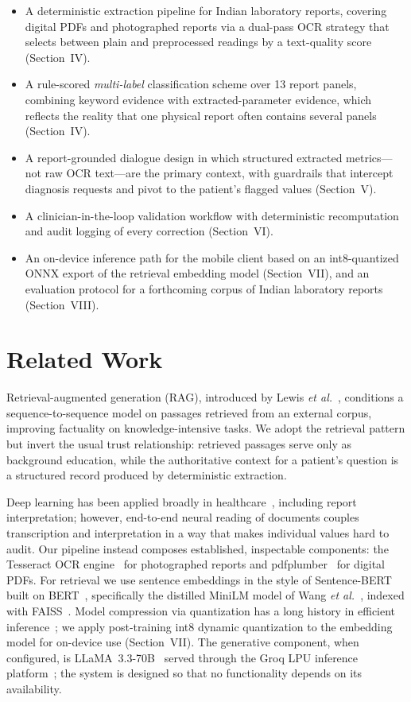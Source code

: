 \documentclass[conference]{IEEEtran}
\begin{document}
\begin{itemize}
\item A deterministic extraction pipeline for Indian laboratory
reports, covering digital PDFs and photographed reports via a dual-pass
OCR strategy that selects between plain and preprocessed readings by a
text-quality score (Section~IV).
\item A rule-scored \emph{multi-label} classification scheme over 13
report panels, combining keyword evidence with extracted-parameter
evidence, which reflects the reality that one physical report often
contains several panels (Section~IV).
\item A report-grounded dialogue design in which structured extracted
metrics---not raw OCR text---are the primary context, with guardrails
that intercept diagnosis requests and pivot to the patient's flagged
values (Section~V).
\item A clinician-in-the-loop validation workflow with deterministic
recomputation and audit logging of every correction (Section~VI).
\item An on-device inference path for the mobile client based on an
int8-quantized ONNX export of the retrieval embedding model
(Section~VII), and an evaluation protocol for a forthcoming corpus of
Indian laboratory reports (Section~VIII).
\end{itemize}

\section{Related Work}
Retrieval-augmented generation (RAG), introduced by Lewis \emph{et
al.}~\cite{lewis2020rag}, conditions a sequence-to-sequence model on
passages retrieved from an external corpus, improving factuality on
knowledge-intensive tasks. We adopt the retrieval pattern but invert
the usual trust relationship: retrieved passages serve only as
background education, while the authoritative context for a patient's
question is a structured record produced by deterministic extraction.

Deep learning has been applied broadly in healthcare~\cite{esteva2019guide},
including report interpretation; however, end-to-end neural reading of
documents couples transcription and interpretation in a way that makes
individual values hard to audit. Our pipeline instead composes
established, inspectable components: the Tesseract OCR
engine~\cite{smith2007tesseract} for photographed reports and
pdfplumber~\cite{pdfplumber} for digital PDFs. For retrieval we use
sentence embeddings in the style of Sentence-BERT~\cite{reimers2019sbert}
built on BERT~\cite{devlin2019bert}, specifically the distilled MiniLM
model of Wang \emph{et al.}~\cite{wang2020minilm}, indexed with
FAISS~\cite{johnson2019faiss}. Model compression via quantization has a
long history in efficient inference~\cite{jacob2018quantization};
we apply post-training int8 dynamic quantization to the embedding model
for on-device use (Section~VII). The generative component, when
configured, is LLaMA~3.3-70B~\cite{llama3herd2024} served through the
Groq LPU inference platform~\cite{abts2020groq}; the system is designed
so that no functionality depends on its availability.
\end{document}
